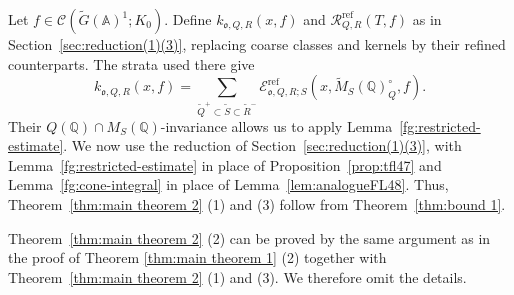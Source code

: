 \documentclass[12pt]{amsart}
\theoremstyle{definition}
\theoremstyle{plain}
\theoremstyle{remark}
\def\Q{\mathbb{Q}}%
\def\A{\mathbb{A}}%
\newcommand{\fo}{\mathfrak{o}}
\newcommand{\cC}{\mathcal{C}}
\newcommand{\cR}{\mathcal{R}}
\numberwithin{equation}{section}
\newcommand{\tG}{\widetilde{G}}
\newcommand{\tM}{\widetilde{M}}
\newcommand{\tQ}{\widetilde{Q}}
\newcommand{\tR}{\widetilde{R}}
\newcommand{\tS}{\widetilde{S}}
\begin{document}
Let $f\in\cC(\tG(\A)^1;K_0)$. 
Define $k_{\fo,Q,R}(x,f)$ and $\cR^{\mathrm{ref}}_{Q,R}(T,f)$
as in Section~\ref{sec:reduction(1)(3)}, replacing coarse
classes and kernels by their refined counterparts.
The strata used there give
\begin{equation*}\label{fg:strata}
 k_{\fo,Q,R}(x,f)
 =\sum_{\tQ^+\subset\tS\subset\tR^-}
       \mathcal E^{\mathrm{ref}}_{\fo,Q,R;S}
          (x,\tM_S(\Q)_Q^\circ,f).
\end{equation*}
Their $Q(\Q)\cap M_S(\Q)$-invariance allows us to apply
Lemma~\ref{fg:restricted-estimate}.
We now use the reduction of Section~\ref{sec:reduction(1)(3)},
with Lemma~\ref{fg:restricted-estimate} in place of Proposition~\ref{prop:tfl47}
and Lemma~\ref{fg:cone-integral} in place of
Lemma~\ref{lem:analogueFL48}.
Thus, Theorem~\ref{thm:main theorem 2} (1) and (3) follow from Theorem~\ref{thm:bound 1}. 

Theorem~\ref{thm:main theorem 2} (2) can be proved by the same argument as in the proof of Theorem \ref{thm:main theorem 1} (2) together with Theorem~\ref{thm:main theorem 2} (1) and (3). 
We therefore omit the details.





\end{document}
